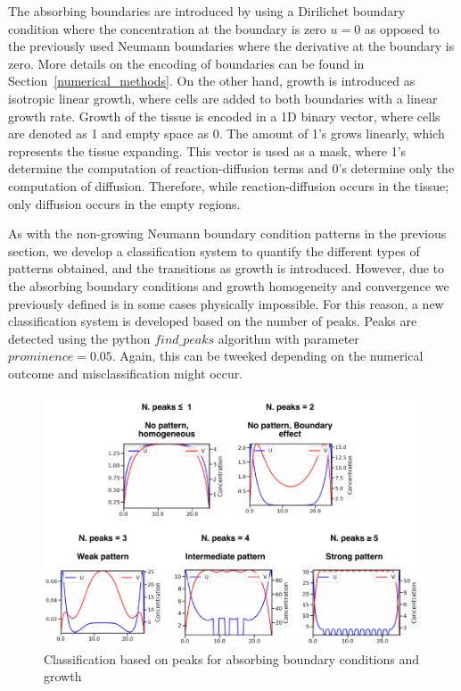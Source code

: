The absorbing boundaries are introduced by using a Dirilichet boundary condition where the concentration at the boundary is zero $u=0$ as opposed to the previously used Neumann boundaries where the derivative at the boundary is zero.
More details on the encoding of boundaries can be found in Section~\ref{numerical_methods}.
On the other hand, growth is introduced as isotropic linear growth, where cells are added to both boundaries with a linear growth rate.
Growth of the tissue is encoded in a 1D binary vector, where cells are denoted as 1 and empty space as 0.
The amount of 1's grows linearly, which represents the tissue expanding.
This vector is used as a mask, where 1's determine the computation of reaction-diffusion terms and 0's determine only the computation of diffusion.
Therefore, while reaction-diffusion occurs in the tissue; only diffusion occurs in the empty regions.

As with the non-growing Neumann boundary condition patterns in the previous section, we develop a classification system to quantify the different types of patterns obtained, and the transitions as growth is introduced.
However, due to the absorbing boundary conditions and growth homogeneity and convergence we previously defined is in some cases physically impossible.
For this reason, a new classification system is developed based on the number of peaks.
Peaks are detected using the python $find\_peaks$ algorithm with parameter
$prominence=0.05$.
Again, this can be tweeked depending on the numerical outcome and misclassification might occur.


\begin{figure}[H] %
    \centering
    \begin{adjustbox}{center}
        \includegraphics[width=1\textwidth]{chapters/Chapter 1/peaks_classification} %
    \end{adjustbox}
    \caption{Classification based on peaks for absorbing boundary conditions and growth}
    \label{fig:peaks_classification} %
\end{figure}

